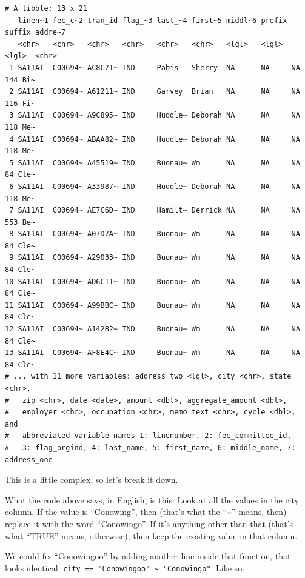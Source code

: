 \documentclass[
  letterpaper,
  DIV=11,
  numbers=noendperiod]{scrreprt}
\begin{document}
\begin{verbatim}
# A tibble: 13 x 21
   linen~1 fec_c~2 tran_id flag_~3 last_~4 first~5 middl~6 prefix suffix addre~7
   <chr>   <chr>   <chr>   <chr>   <chr>   <chr>   <lgl>   <lgl>  <lgl>  <chr>  
 1 SA11AI  C00694~ AC8C71~ IND     Pabis   Sherry  NA      NA     NA     144 Bi~
 2 SA11AI  C00694~ A61211~ IND     Garvey  Brian   NA      NA     NA     116 Fi~
 3 SA11AI  C00694~ A9C895~ IND     Huddle~ Deborah NA      NA     NA     118 Me~
 4 SA11AI  C00694~ ABAA82~ IND     Huddle~ Deborah NA      NA     NA     118 Me~
 5 SA11AI  C00694~ A45519~ IND     Buonau~ Wm      NA      NA     NA     84 Cle~
 6 SA11AI  C00694~ A33987~ IND     Huddle~ Deborah NA      NA     NA     118 Me~
 7 SA11AI  C00694~ AE7C6D~ IND     Hamilt~ Derrick NA      NA     NA     553 Be~
 8 SA11AI  C00694~ A07D7A~ IND     Buonau~ Wm      NA      NA     NA     84 Cle~
 9 SA11AI  C00694~ A29033~ IND     Buonau~ Wm      NA      NA     NA     84 Cle~
10 SA11AI  C00694~ AD6C11~ IND     Buonau~ Wm      NA      NA     NA     84 Cle~
11 SA11AI  C00694~ A99BBC~ IND     Buonau~ Wm      NA      NA     NA     84 Cle~
12 SA11AI  C00694~ A142B2~ IND     Buonau~ Wm      NA      NA     NA     84 Cle~
13 SA11AI  C00694~ AF8E4C~ IND     Buonau~ Wm      NA      NA     NA     84 Cle~
# ... with 11 more variables: address_two <lgl>, city <chr>, state <chr>,
#   zip <chr>, date <date>, amount <dbl>, aggregate_amount <dbl>,
#   employer <chr>, occupation <chr>, memo_text <chr>, cycle <dbl>, and
#   abbreviated variable names 1: linenumber, 2: fec_committee_id,
#   3: flag_orgind, 4: last_name, 5: first_name, 6: middle_name, 7: address_one
\end{verbatim}

This is a little complex, so let's break it down.

What the code above says, in English, is this: Look at all the values in
the city column. If the value is ``Conowing'', then (that's what the
``\textasciitilde{}'' means, then) replace it with the word
``Conowingo''. If it's anything other than that (that's what ``TRUE''
means, otherwise), then keep the existing value in that column.

We could fix ``Conowingoo'' by adding another line inside that function,
that looks identical:
\texttt{city\ ==\ "Conowingoo"\ \textasciitilde{}\ "Conowingo"}. Like
so.
\end{document}
